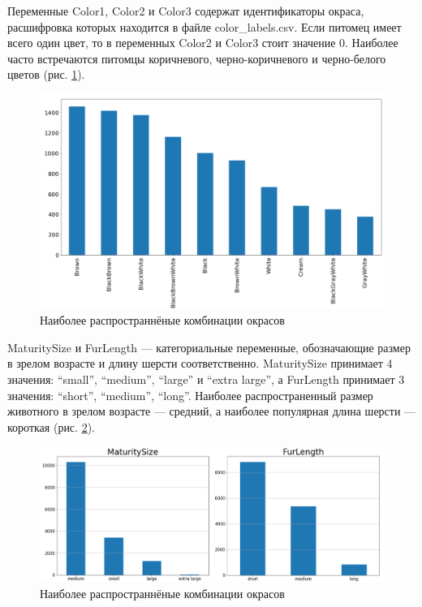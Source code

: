\documentclass[14pt]{mmcs_article}
\begin{document}
Переменные Color1, Color2 и Color3 содержат идентификаторы окраса, расшифровка которых находится в файле color\_labels.csv. Если питомец имеет всего один цвет, то в переменных Color2 и Color3 стоит значение 0. Наиболее часто встречаются питомцы коричневого, черно-коричневого и черно-белого цветов (рис. \ref{analyse:color}).

\begin{figure}[H]
	\centering
	\includegraphics[scale=0.5]{color.png}
	\caption{Наиболее распространнёные комбинации окрасов}\label{analyse:color}
\end{figure}

MaturitySize и FurLength --- категориальные переменные, обозначающие размер в зрелом возрасте и длину шерсти соответственно. MaturitySize принимает 4 значения: ``small'', ``medium'', ``large'' и ``extra large'', а FurLength принимает 3 значения: ``short'', ``medium'', ``long''. Наиболее распространенный размер животного в зрелом возрасте --- средний, а наиболее популярная длина шерсти --- короткая (рис. \ref{analyse:sizelength}).

\begin{figure}[H]
	\centering
	\includegraphics[scale=0.4]{sizelength.png}
	\caption{Наиболее распространнёные комбинации окрасов}\label{analyse:sizelength}
\end{figure}
\end{document}
